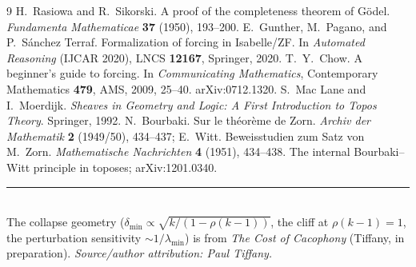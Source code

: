 \documentclass[11pt]{article}
\theoremstyle{definition}
\theoremstyle{remark}
\newcommand{\lmin}{\lambda_{\min}}
\begin{document}
\begin{thebibliography}{9}
 H.~Rasiowa and R.~Sikorski. A proof of the completeness theorem of
G\"odel. \emph{Fundamenta Mathematicae} \textbf{37} (1950), 193--200.
 E.~Gunther, M.~Pagano, and P.~S\'anchez Terraf. Formalization of forcing in
Isabelle/ZF. In \emph{Automated Reasoning} (IJCAR 2020), LNCS \textbf{12167}, Springer, 2020.
 T.~Y.~Chow. A beginner's guide to forcing. In \emph{Communicating Mathematics},
Contemporary Mathematics \textbf{479}, AMS, 2009, 25--40. arXiv:0712.1320.
 S.~Mac Lane and I.~Moerdijk. \emph{Sheaves in Geometry and Logic: A
First Introduction to Topos Theory}. Springer, 1992.
 N.~Bourbaki. Sur le th\'eor\`eme de Zorn. \emph{Archiv der Mathematik}
\textbf{2} (1949/50), 434--437; E.~Witt. Beweisstudien zum Satz von M.~Zorn. \emph{Mathematische
Nachrichten} \textbf{4} (1951), 434--438.
 The internal Bourbaki--Witt principle in toposes; arXiv:1201.0340.
\end{thebibliography}

\bigskip
\noindent\rule{\linewidth}{0.4pt}\\[0.3em]
\footnotesize
The collapse geometry ($\delta_{\min}\propto\sqrt{k/(1-\rho(k-1))}$, the cliff at $\rho(k-1)=1$,
the perturbation sensitivity $\sim 1/\lmin$) is from \emph{The Cost of Cacophony} (Tiffany, in
preparation). \emph{Source/author attribution: Paul Tiffany.}
\end{document}

